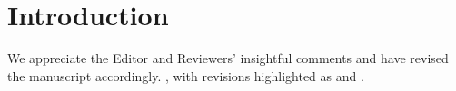 \noindent\hrulefill
{}

\section*{Introduction}
We appreciate the Editor and Reviewers' insightful comments and have revised the manuscript accordingly.  , with revisions highlighted as  and .

